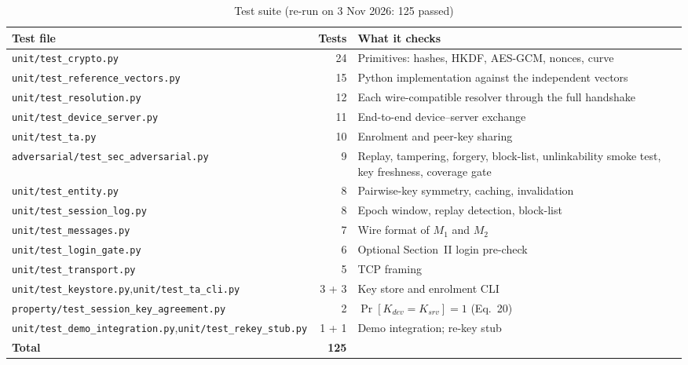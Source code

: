 \begin{table}[H]
\centering
\caption{Test suite (re-run on 3 Nov 2026: 125 passed)}
\label{tab:tests}
\footnotesize
\renewcommand{\arraystretch}{1.1}
\begin{tabularx}{\textwidth}{|>{\raggedright\arraybackslash}p{}|r|>{\raggedright\arraybackslash}X|}
\hline
\textbf{Test file} & \textbf{Tests} & \textbf{What it checks}\\ \hline
\texttt{unit/test\_crypto.py} & 24 & Primitives: hashes, HKDF, AES-GCM, nonces, curve\\ \hline
\texttt{unit/test\_reference\_vectors.py} & 15 & Python implementation against the independent vectors\\ \hline
\texttt{unit/test\_resolution.py} & 12 & Each wire-compatible resolver through the full handshake\\ \hline
\texttt{unit/test\_device\_server.py} & 11 & End-to-end device--server exchange\\ \hline
\texttt{unit/test\_ta.py} & 10 & Enrolment and peer-key sharing\\ \hline
\texttt{adversarial/test\_sec\_}\newline\texttt{adversarial.py} & 9 & Replay, tampering, forgery, block-list, unlinkability smoke test, key freshness, coverage gate\\ \hline
\texttt{unit/test\_entity.py} & 8 & Pairwise-key symmetry, caching, invalidation\\ \hline
\texttt{unit/test\_session\_log.py} & 8 & Epoch window, replay detection, block-list\\ \hline
\texttt{unit/test\_messages.py} & 7 & Wire format of $M_1$ and $M_2$\\ \hline
\texttt{unit/test\_login\_gate.py} & 6 & Optional Section~II login pre-check\\ \hline
\texttt{unit/test\_transport.py} & 5 & TCP framing\\ \hline
\texttt{unit/test\_keystore.py},\newline \texttt{unit/test\_ta\_cli.py} & 3 + 3 & Key store and enrolment CLI\\ \hline
\texttt{property/test\_session\_key\_}\newline\texttt{agreement.py} & 2 & $\Pr[K_{dev}=K_{srv}]=1$ (Eq.~20)\\ \hline
\texttt{unit/test\_demo\_integration.py},\newline \texttt{unit/test\_rekey\_stub.py} & 1 + 1 & Demo integration; re-key stub\\ \hline
\textbf{Total} & \textbf{125} & \\ \hline
\end{tabularx}
\end{table}

